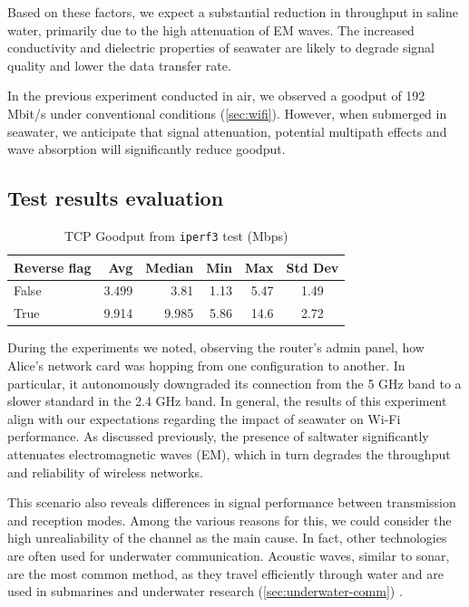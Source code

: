 Based on these factors, we expect a substantial reduction in throughput in saline water, primarily due to the high attenuation of EM waves. The increased conductivity and dielectric properties of seawater are likely to degrade signal quality and lower the data transfer rate. \cite{arrabitothesis}

In the previous experiment conducted in air, we observed a goodput of 192 Mbit/s under conventional conditions (\ref{sec:wifi}). However, when submerged in seawater, we anticipate that signal attenuation, potential multipath effects and wave absorption will significantly reduce goodput.


\subsection{Test results evaluation}


\begin{table}[H]
    \centering
    \caption{TCP Goodput from \texttt{iperf3} test (Mbps)}
    \label{tab:tcp-throughput-wifi}
    \begin{tabular}{lrrrrc}
        \hline
        \textbf{Reverse flag} & \textbf{Avg} & \textbf{Median} & \textbf{Min} & \textbf{Max} & \textbf{Std Dev} \\
        \hline
        False & 3.499 & 3.81 & 1.13 & 5.47 & 1.49 \\
        True & 9.914 & 9.985 & 5.86 & 14.6 & 2.72 \\
        \hline
    \end{tabular}
\end{table}
During the experiments we noted, observing the router's admin panel, how Alice's network card was hopping from one configuration to another. In particular, it autonomously downgraded its connection from the 5 GHz band to a slower standard in the 2.4 GHz band. In general, the results of this experiment align with our expectations regarding the impact of seawater on Wi-Fi performance. As discussed previously, the presence of saltwater significantly attenuates electromagnetic waves (EM), which in turn degrades the throughput and reliability of wireless networks. 

This scenario also reveals differences in signal performance between transmission and reception modes. Among the various reasons for this, we could consider the high unrealiability of the channel as the main cause. In fact, other technologies are often used for underwater communication. Acoustic waves, similar to sonar, are the most common method, as they travel efficiently through water and are used in submarines and underwater research (\ref{sec:underwater-comm}) \cite{arrabitothesis}.

